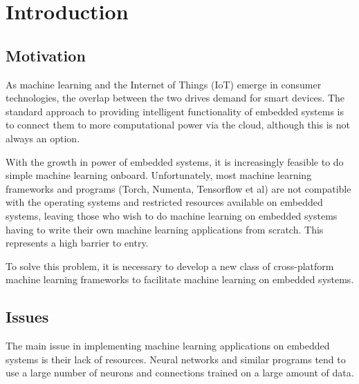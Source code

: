 \documentclass[a4paper]{article}
\begin{document}

\pagebreak
\tableofcontents
\pagebreak


\newpage
\section{Introduction}
\label{sec:in}

\subsection{Motivation}%
\label{subsec:in_motivation}

As machine learning and the Internet of Things (IoT) emerge in consumer technologies, the overlap between the two drives demand for smart devices. The standard approach to providing intelligent functionality of embedded systems is to connect them to more computational power via the cloud, although this is not always an option.

With the growth in power of embedded systems, it is increasingly feasible to do simple machine learning onboard. Unfortunately, most machine learning frameworks and programs (Torch, Numenta, Tensorflow et al) are not compatible with the operating systems and restricted resources available on embedded systems, leaving those who wish to do machine learning on embedded systems having to write their own machine learning applications from scratch. This represents a high barrier to entry.

To solve this problem, it is necessary to develop a new class of cross-platform machine learning frameworks to facilitate machine learning on embedded systems.

\subsection{Issues}%
\label{subsec:in_issues}

The main issue in implementing machine learning applications on embedded systems is their lack of resources. Neural networks and similar programs tend to use a large number of neurons and connections trained on a large amount of data.
\end{document}
